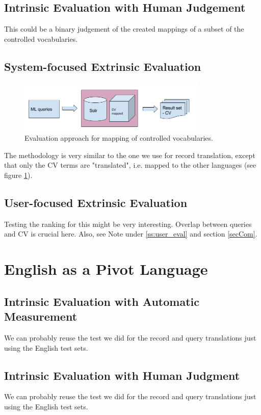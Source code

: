 \documentclass[a4paper,11pt]{article}
\begin{document}
\subsection{Intrinsic Evaluation with Human Judgement}
This could be a binary judgement of the created mappings of a subset of the controlled vocabularies.

\subsection{System-focused Extrinsic Evaluation}

\begin{figure}
	\centering
  \includegraphics[width=0.8\textwidth]{./img/CV-Mapped.png}
	\caption{Evaluation approach for mapping of controlled vocabularies.}
	\label{figsystem}
\end{figure}

The methodology is very similar to the one we use for record translation, except that only the CV terms are "translated", i.e. mapped to the other languages (see figure \ref{figsystem}).


\subsection{User-focused Extrinsic Evaluation}
Testing the ranking for this might be very interesting. Overlap between queries and CV is crucial here. Also, see Note under \ref{ss:user_eval} and section \ref{secCom}.

\section{English as a Pivot Language}
\subsection{Intrinsic Evaluation with Automatic Measurement}
We can probably reuse the test we did for the record and query translations just using the English test sets. 
\subsection{Intrinsic Evaluation with Human Judgment}
We can probably reuse the test we did for the record and query translations just using the English test sets. 
\end{document}

